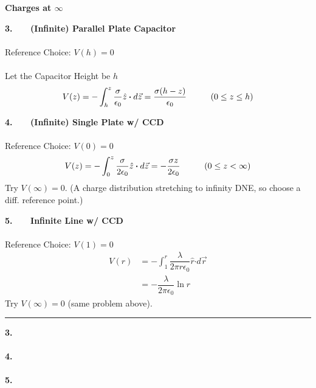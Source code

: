 \documentclass[12pt]{article}
\newcommand*{\dotP}{\boldsymbol \cdot}		%
\begin{document}
%
%
%
\newpage
\noindent \textbf{Charges at \(\infty\)}
\hfill \break \\
\begin{minipage}[t]{0.5\textwidth}
	\textbf{3. \ \ \ (Infinite) Parallel Plate Capacitor}\\ \\
	Reference Choice: \( V(h) = 0 \)\\ \\
	Let the Capacitor Height be \(h\) 
	\[ V( z ) = - \int_{h}^{z} \frac{\sigma}{\epsilon_0} \hat{z} \dotP d\vec{z}
		= \frac{\sigma (h-z)}{\epsilon_0} 
		\ \ \ \ \indent (0 \leq z \leq h)
	\]
	
	\hfill \break
	\textbf{4. \ \ \ (Infinite) Single Plate w/ CCD}\\ \\
	Reference Choice: \( V(0) = 0 \)
	\[ V( z ) = - \int_{0}^{z} \frac{\sigma}{2 \epsilon_0} \hat{z} \dotP d\vec{z}
		= - \frac{\sigma z}{2 \epsilon_0} 
		\ \ \ \ \indent (0 \leq z < \infty) 
	\]
	\hfill \break 
	Try \( V(\infty) = 0 \). (A charge distribution 
		stretching to infinity DNE, so choose a diff. reference point.)
	
	\hfill \break
	\textbf{5. \ \ \ Infinite Line w/ CCD}\\ \\
	Reference Choice: \( V(1) = 0 \)
	\begin{align*}
		V(r) &= - \int_{1}^{r} \dfrac{ \lambda }{2 \pi r \epsilon_0} \hat{r} \dotP d\vec{r} \\
		&= - \dfrac{ \lambda }{2 \pi \epsilon_0} \ln{r}
	\end{align*}
	\hfill \break
	Try \( V(\infty) = 0 \) (same problem above). \\	
\end{minipage}
\hspace{0.02\textwidth}
\rule[-438pt]{.5pt}{450pt}
\hspace{0.02\textwidth}
\begin{minipage}[t]{0.4\textwidth}
	\textbf{3. \ \ \ }\\ \\
	
	\hfill \break
	\textbf{4. \ \ \ }\\ \\

	\hfill \break
	\textbf{5. \ \ \ }\\ \\

\end{minipage}
\end{document}
